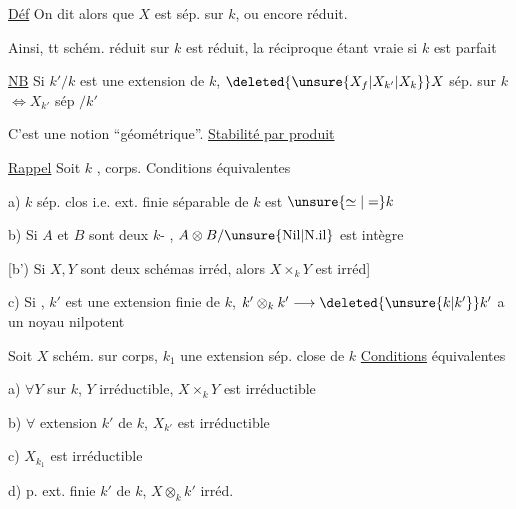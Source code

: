 \uline{Déf} On dit alors que $X$ est sép. sur $k$, ou encore   réduit.

Ainsi,  tt schém.  réduit sur $k$ est  réduit, la réciproque étant vraie si $k$ est parfait

\uline{NB} Si $k'/k$ est une extension de $k$, $\deleted{\unsure{X_f|X_{k'}|X_k}}X$ sép. sur $k$ $\Longleftrightarrow X_{k'}$ sép $/k'$

C'est une notion ``géométrique''. \hfill\uline{Stabilité par produit}


\uline{Rappel} Soit $k$ , corps. Conditions équivalentes

a) $k$ sép. clos i.e.  ext. finie séparable de $k$ est $\unsure{\simeq|=} k$

b) Si $A$ et $B$ sont deux $k$- , $A\otimes B/\mathrm{\unsure{Nil|N.il}}$ est intègre

[b') Si $X,Y$ sont deux schémas irréd, alors $X\times_k Y$ est irréd]

c) Si , $k'$ est une extension finie de $k$, $k'\otimes_k k'\longrightarrow\deleted{\unsure{k|k'}}k'$ a un noyau nilpotent


Soit $X$ schém. sur corps, $k_1$ une extension sép. close de $k$ \uline{Conditions} équivalentes

a) $\forall Y$ sur $k$, $Y$ irréductible, $X\times_k Y$ est irréductible

b) $\forall$ extension $k'$ de $k$, $X_{k'}$ est irréductible

c) $X_{k_1}$ est irréductible

d) p.  ext. finie  $k'$ de $k$, $X\otimes_k k'$ irréd.


